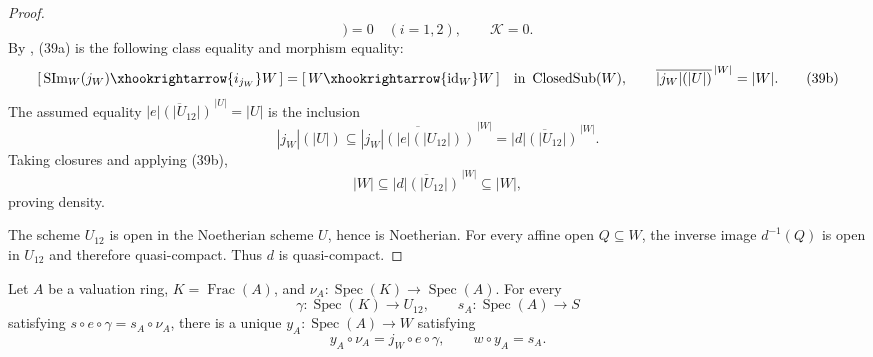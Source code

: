 \begin{proof}
\[        \bigr)=0
    \quad(i=1,2),
    \qquad
    \mathcal K=0.                                                 \tag{39a}
  \]
  By , (39a) is the following class
  equality and morphism equality:
  \[
    [\,\operatorname{SIm}_W(j_W)\xhookrightarrow{i_{j_W}}W\,]
      =[\,W\xhookrightarrow{\operatorname{id}_W}W\,]
      \quad\text{in }\operatorname{ClosedSub}(W),
    \qquad
    \overline{|j_W|(|U|)}^{\,|W|}=|W|.                            \tag{39b}
  \]
  The assumed equality
  $\overline{|e|(|U_{12}|)}^{\,|U|}=|U|$ is the inclusion
  \[
    |j_W|(|U|)
      \subseteq\overline{|j_W|(|e|(|U_{12}|))}^{\,|W|}
      =\overline{|d|(|U_{12}|)}^{\,|W|}.
  \]
  Taking closures and applying (39b),
  \[
    |W|
      \subseteq\overline{|d|(|U_{12}|)}^{\,|W|}
      \subseteq|W|,
  \]
  proving density.

  The scheme $U_{12}$ is open in the Noetherian scheme $U$, hence is
  Noetherian.  For every affine open $Q\subseteq W$, the inverse image
  $d^{-1}(Q)$ is open in $U_{12}$ and therefore quasi-compact.  Thus $d$ is
  quasi-compact.
\end{proof}

\begin{lemma}
  \label{lemma:nagata-two-open-valuative-lifting}
  \lean{}

  Let $A$ be a valuation ring, $K=\operatorname{Frac}(A)$, and
  $\nu_A\colon\operatorname{Spec}(K)\to\operatorname{Spec}(A)$.  For every
  \[
    \gamma\colon\operatorname{Spec}(K)\to U_{12},\qquad
    s_A\colon\operatorname{Spec}(A)\to S
  \]
  satisfying $s\circ e\circ\gamma=s_A\circ\nu_A$, there is a unique
  $y_A\colon\operatorname{Spec}(A)\to W$ satisfying
  \[
    y_A\circ\nu_A=j_W\circ e\circ\gamma,\qquad
    w\circ y_A=s_A.
  \]
\end{lemma}

